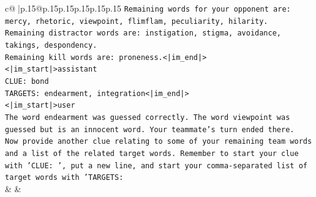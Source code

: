 \documentclass{article}
\begin{document}
{\begin{supertabular}{c@{$\;$}|p{.15\linewidth}@{}p{.15\linewidth}p{.15\linewidth}p{.15\linewidth}p{.15\linewidth}p{.15\linewidth}}
{{{\texttt{Remaining words for your opponent are: mercy, rhetoric, viewpoint, flimflam, peculiarity, hilarity.} \\
\texttt{Remaining distractor words are: instigation, stigma, avoidance, takings, despondency.} \\
\texttt{Remaining kill words are: proneness.<|im\_end|>} \\
\texttt{<|im\_start|>assistant} \\
\texttt{CLUE: bond} \\
\texttt{TARGETS: endearment, integration<|im\_end|>} \\
\texttt{<|im\_start|>user} \\
\texttt{The word endearment was guessed correctly. The word viewpoint was guessed but is an innocent word. Your teammate's turn ended there.} \\
\texttt{Now provide another clue relating to some of your remaining team words and a list of the related target words. Remember to start your clue with 'CLUE: ', put a new line, and start your comma{-}separated list of target words with 'TARGETS:} \\
            }
        }
    }
    & & \\ \\


\end{supertabular}}
\end{document}
